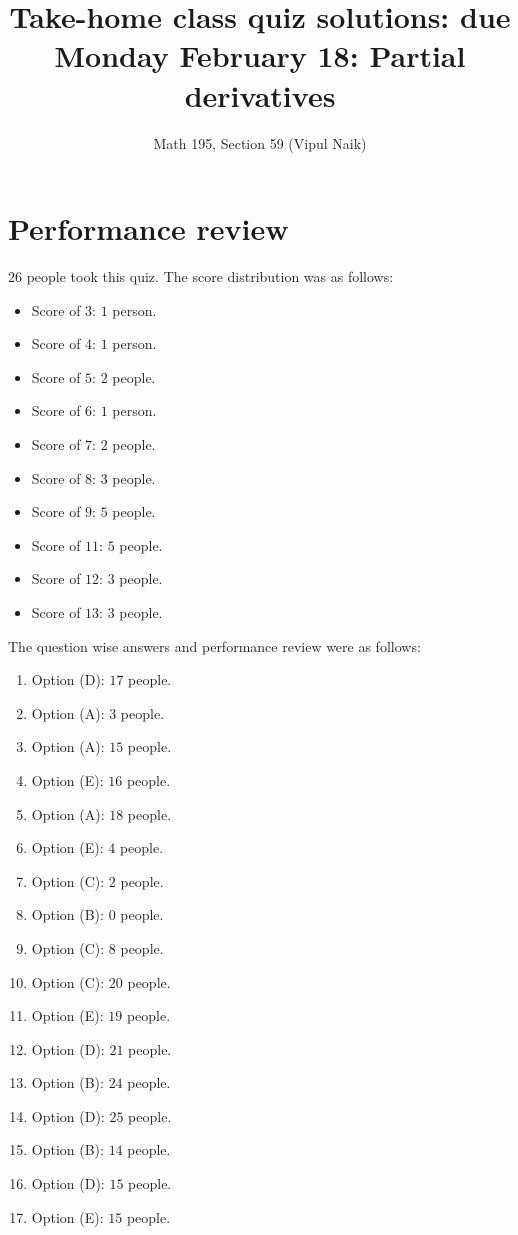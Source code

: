 \documentclass[10pt]{amsart}
\title{Take-home class quiz solutions: due Monday February 18: Partial derivatives}
\author{Math 195, Section 59 (Vipul Naik)}
\begin{document}
\maketitle

\section{Performance review}

$26$ people took this quiz. The score distribution was as follows:

\begin{itemize}
\item Score of $3$: $1$ person.
\item Score of $4$: $1$ person.
\item Score of $5$: $2$ people.
\item Score of $6$: $1$ person.
\item Score of $7$: $2$ people.
\item Score of $8$: $3$ people.
\item Score of $9$: $5$ people.
\item Score of $11$: $5$ people.
\item Score of $12$: $3$ people.
\item Score of $13$: $3$ people.
\end{itemize}

The question wise answers and performance review were as follows:

\begin{enumerate}
\item Option (D): $17$ people.
\item Option (A): $3$ people.
\item Option (A): $15$ people.
\item Option (E): $16$ people.
\item Option (A): $18$ people.
\item Option (E): $4$ people.
\item Option (C): $2$ people.
\item Option (B): $0$ people.
\item Option (C): $8$ people.
\item Option (C): $20$ people.
\item Option (E): $19$ people.
\item Option (D): $21$ people.
\item Option (B): $24$ people.
\item Option (D): $25$ people.
\item Option (B): $14$ people.
\item Option (D): $15$ people.
\item Option (E): $15$ people.
\end{enumerate}
\end{document}
